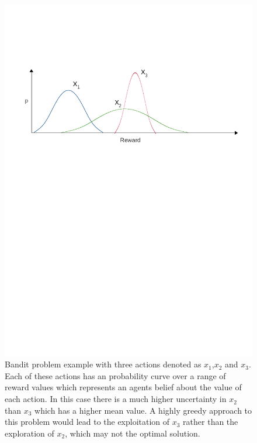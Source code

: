 	\begin{figure}[h]\label{fig:BPI}
	
		\centering 
		\includegraphics[trim= 100 650 100 100 ,scale=0.5]{BanditIntro.png}


		\caption{Bandit problem example with three actions denoted as \(x_1\),\(x_2\) and \(x_3\). Each of these actions has an probability curve over a range of reward values which represents an agents belief about the value of each action. In this case there is a much higher uncertainty in \(x_2\) than \(x_3\) which has a higher mean value. A highly greedy approach to this problem would lead to the exploitation of \(x_3\) rather than the exploration of \(x_2\), which may not the optimal solution.}



	\end{figure}


